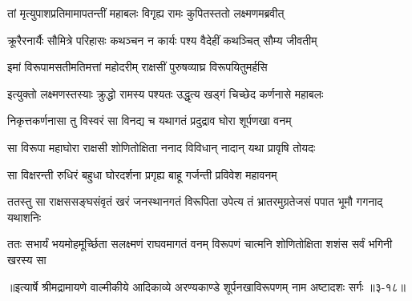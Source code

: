 \twolineshloka
{तां मृत्युपाशप्रतिमामापतन्तीं महाबलः}
{विगृह्य रामः कुपितस्ततो लक्ष्मणमब्रवीत्} %

\twolineshloka
{क्रूरैरनार्यैः सौमित्रे परिहासः कथञ्चन}
{न कार्यः पश्य वैदेहीं कथञ्चित् सौम्य जीवतीम्} %

\twolineshloka
{इमां विरूपामसतीमतिमत्तां महोदरीम्}
{राक्षसीं पुरुषव्याघ्र विरूपयितुमर्हसि} %

\twolineshloka
{इत्युक्तो लक्ष्मणस्तस्याः क्रुद्धो रामस्य पश्यतः}
{उद्धृत्य खड्गं चिच्छेद कर्णनासे महाबलः} %

\twolineshloka
{निकृत्तकर्णनासा तु विस्वरं सा विनद्य च}
{यथागतं प्रदुद्राव घोरा शूर्पणखा वनम्} %

\twolineshloka
{सा विरूपा महाघोरा राक्षसी शोणितोक्षिता}
{ननाद विविधान् नादान् यथा प्रावृषि तोयदः} %

\twolineshloka
{सा विक्षरन्ती रुधिरं बहुधा घोरदर्शना}
{प्रगृह्य बाहू गर्जन्ती प्रविवेश महावनम्} %

\twolineshloka
{ततस्तु सा राक्षससङ्घसंवृतं खरं जनस्थानगतं विरूपिता}
{उपेत्य तं भ्रातरमुग्रतेजसं पपात भूमौ गगनाद् यथाशनिः} %

\twolineshloka
{ततः सभार्यं भयमोहमूर्च्छिता सलक्ष्मणं राघवमागतं वनम्}
{विरूपणं चात्मनि शोणितोक्षिता शशंस सर्वं भगिनी खरस्य सा} %


॥इत्यार्षे श्रीमद्रामायणे वाल्मीकीये आदिकाव्ये अरण्यकाण्डे शूर्पनखाविरूपणम् नाम अष्टादशः सर्गः ॥३-१८॥
